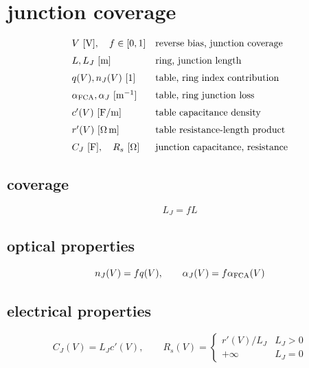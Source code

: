 \section*{junction coverage}
\[
\begin{array}{ll}V\ [\mathrm V],\quad f\in[0,1]&\text{reverse bias, junction coverage}\\[0.6em]L,L_J\ [\mathrm m]&\text{ring, junction length}\\[0.6em]q(V),n_J(V)\ [1]&\text{table, ring index contribution}\\[0.6em]\alpha_{\rm FCA},\alpha_J\ [\mathrm{m^{-1}}]&\text{table, ring junction loss}\\[0.6em]c'(V)\ [\mathrm{F/m}]&\text{table capacitance density}\\[0.6em]r'(V)\ [\Omega\,\mathrm m]&\text{table resistance-length product}\\[0.6em]C_J\ [\mathrm F],\quad R_s\ [\Omega]&\text{junction capacitance, resistance}\end{array}
\]
\subsection*{coverage}
\[
\displaystyle L_J=fL
\]
\subsection*{optical properties}
\[
\displaystyle n_J(V)=fq(V),\qquad\alpha_J(V)=f\alpha_{\rm FCA}(V)
\]
\subsection*{electrical properties}
\[
\displaystyle C_J(V)=L_Jc'(V),\qquad R_s(V)=\begin{cases}r'(V)/L_J&L_J>0\\+\infty&L_J=0\end{cases}
\]
